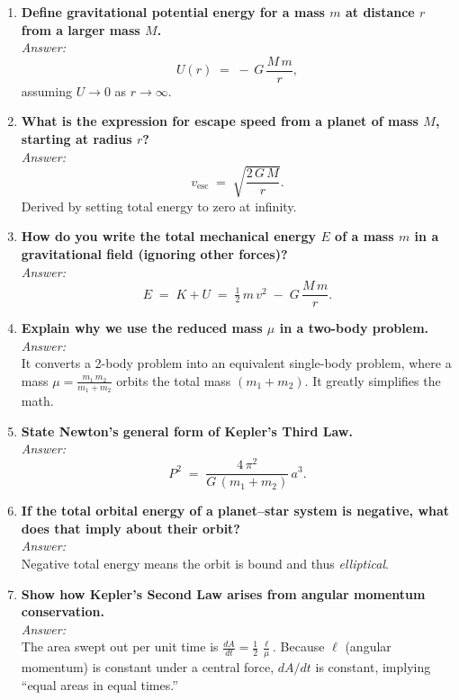 \begin{enumerate}
  \item \textbf{Define gravitational potential energy for a mass $m$ at distance $r$ from a larger mass $M$.}\\
    \emph{Answer:}\\
    \[
      U(r)
      \;=\;
      -\,G\,\frac{M\,m}{r},
    \]
    assuming $U \to 0$ as $r \to \infty$.

  \item \textbf{What is the expression for escape speed from a planet of mass $M$, starting at radius $r$?}\\
    \emph{Answer:}\\
    \[
      v_{\text{esc}}
      \;=\;
      \sqrt{\frac{2\,G\,M}{r}}.
    \]
    Derived by setting total energy to zero at infinity.

  \item \textbf{How do you write the total mechanical energy $E$ of a mass $m$ in a gravitational field (ignoring other forces)?}\\
    \emph{Answer:}\\
    \[
      E
      \;=\;
      K + U
      \;=\;
      \tfrac12\,m\,v^2
      \;-\;
      G\,\frac{M\,m}{r}.
    \]

  \item \textbf{Explain why we use the reduced mass $\mu$ in a two-body problem.}\\
    \emph{Answer:}\\
    It converts a 2-body problem into an equivalent single-body problem, where a mass
    \(
      \mu
      =
      \frac{m_1\,m_2}{m_1 + m_2}
    \)
    orbits the total mass $(m_1 + m_2)$. It greatly simplifies the math.

  \item \textbf{State Newton’s general form of Kepler’s Third Law.}\\
    \emph{Answer:}\\
    \[
      P^2
      \;=\;
      \frac{4\,\pi^2}{G\,(m_1 + m_2)}\,a^3.
    \]

  \item \textbf{If the total orbital energy of a planet--star system is negative, what does that imply about their orbit?}\\
    \emph{Answer:}\\
    Negative total energy means the orbit is bound and thus \emph{elliptical}.

  \item \textbf{Show how Kepler’s Second Law arises from angular momentum conservation.}\\
    \emph{Answer:}\\
    The area swept out per unit time is
    \(
      \frac{dA}{dt}
      =
      \frac{1}{2}\,\frac{\ell}{\mu}.
    \)
    Because $\ell$ (angular momentum) is constant under a central force, $dA/dt$ is constant, implying ``equal areas in equal times.''


\end{enumerate}
